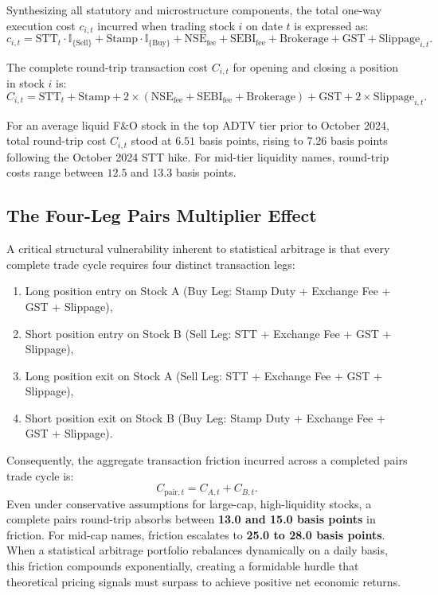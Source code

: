 \documentclass[11pt,a4paper]{article}
\begin{document}
Synthesizing all statutory and microstructure components, the total one-way execution cost $c_{i,t}$ incurred when trading stock $i$ on date $t$ is expressed as:
\begin{equation}
    c_{i,t} = \text{STT}_t \cdot \mathbb{I}_{\{\text{Sell}\}} + \text{Stamp} \cdot \mathbb{I}_{\{\text{Buy}\}} + \text{NSE}_{\text{fee}} + \text{SEBI}_{\text{fee}} + \text{Brokerage} + \text{GST} + \text{Slippage}_{i,t}.
    \label{eq:one_way_cost}
\end{equation}

The complete round-trip transaction cost $C_{i,t}$ for opening and closing a position in stock $i$ is:
\begin{equation}
    C_{i,t} = \text{STT}_t + \text{Stamp} + 2 \times (\text{NSE}_{\text{fee}} + \text{SEBI}_{\text{fee}} + \text{Brokerage}) + \text{GST} + 2 \times \text{Slippage}_{i,t}.
    \label{eq:round_trip_cost}
\end{equation}

For an average liquid F\&O stock in the top ADTV tier prior to October 2024, total round-trip cost $C_{i,t}$ stood at $6.51$ basis points, rising to $7.26$ basis points following the October 2024 STT hike. For mid-tier liquidity names, round-trip costs range between $12.5$ and $13.3$ basis points.

\subsection{The Four-Leg Pairs Multiplier Effect}
A critical structural vulnerability inherent to statistical arbitrage is that every complete trade cycle requires four distinct transaction legs:
\begin{enumerate}
    \item Long position entry on Stock A (Buy Leg: Stamp Duty + Exchange Fee + GST + Slippage),
    \item Short position entry on Stock B (Sell Leg: STT + Exchange Fee + GST + Slippage),
    \item Long position exit on Stock A (Sell Leg: STT + Exchange Fee + GST + Slippage),
    \item Short position exit on Stock B (Buy Leg: Stamp Duty + Exchange Fee + GST + Slippage).
\end{enumerate}
Consequently, the aggregate transaction friction incurred across a completed pairs trade cycle is:
\begin{equation}
    C_{\text{pair}, t} = C_{A,t} + C_{B,t}.
    \label{eq:pair_cost}
\end{equation}
Even under conservative assumptions for large-cap, high-liquidity stocks, a complete pairs round-trip absorbs between \textbf{13.0 and 15.0 basis points} in friction. For mid-cap names, friction escalates to \textbf{25.0 to 28.0 basis points}. When a statistical arbitrage portfolio rebalances dynamically on a daily basis, this friction compounds exponentially, creating a formidable hurdle that theoretical pricing signals must surpass to achieve positive net economic returns.
\end{document}
